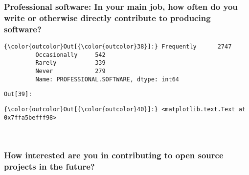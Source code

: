 \documentclass[11pt]{article}
\begin{document}
    \subsubsection{Professional software: In your main job, how often do you
write or otherwise directly contribute to producing
software?}\label{professional-software-in-your-main-job-how-often-do-you-write-or-otherwise-directly-contribute-to-producing-software}


            \begin{Verbatim}[commandchars=\\\{\}]
{\color{outcolor}Out[{\color{outcolor}38}]:} Frequently      2747
         Occasionally     542
         Rarely           339
         Never            279
         Name: PROFESSIONAL.SOFTWARE, dtype: int64
\end{Verbatim}
        
\texttt{\color{outcolor}Out[{\color{outcolor}39}]:}
    

    


            \begin{Verbatim}[commandchars=\\\{\}]
{\color{outcolor}Out[{\color{outcolor}40}]:} <matplotlib.text.Text at 0x7ffa5befff98>
\end{Verbatim}
        
    \begin{center}
    \end{center}
    { \hspace*{\fill} \\}
    
    \subsubsection{How interested are you in contributing to open source
projects in the
future?}\label{how-interested-are-you-in-contributing-to-open-source-projects-in-the-future}
\end{document}
